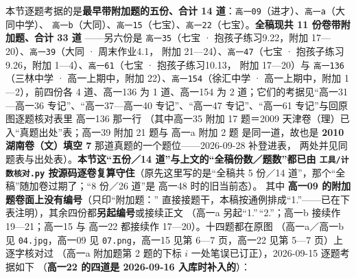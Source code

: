 \documentclass[a4paper,11pt]{article}
\begin{document}
本节逐题考据的是\textbf{最早带附加题的五份、合计 14 道}：\texttt{高一09}（进才）、\texttt{高一a}（大同中学）、
\texttt{高一b}（大同）、\texttt{高一15}（七宝）、\texttt{高一22}（七宝）。\textbf{全稿现共 11 份卷带附加题、合计 33 道}
------另六份是 \texttt{高一35}（七宝 · 抱孩子练习9.22，附加 17---20）、\texttt{高一39}（大同 · 周末作业4.1，
附加 21---24）、\texttt{高一47}（七宝 · 抱孩子练习9.26，附加 1---4）、\texttt{高一61}（七宝 · 抱孩子练习10.13，
附加 17---20）与 \texttt{高一136}（三林中学 · 高一上期中，附加 22）、\texttt{高一154}（徐汇中学 · 高一上期中，附加 1---2），前四份各 4 道、高一136 为 1 道、高一154 为 2 道；它们的考据见``高一31---高一36 专记''、``高一37---高一40 专记''、``高一47 专记''、``高一61 专记''与回原图逐题核对表里 高一136 那一行
（其中高一35 附加 17 题＝2009 天津卷（理）已入``真题出处''表；高一39 附加 21 题与 高一a 附加 2 题
是同一道，故也是 \textbf{2010 湖南卷（文）填空 7} 那道真题的一个题位------2026-09-28 补登进表，
两处并见同题表与出处表）。\textbf{本节这``五份／14 道''与上文的``全稿份数／题数''都已由 \texttt{工具/\allowbreak{}计数核对.py}
按源码逐卷复算守住}（原先这里写的是``全稿共 5 份／14 道''，那个``全稿''随加卷过期了；``8 份／26 道''是 高一48 时的旧当前态）。
其中 \textbf{高一09 的附加题卷面上没有编号}（只印``附加题：''
直接接题干，本稿按通例排成``1.''------已在下表注明），其余四份都\textbf{另起编号}或接续正文
（高一a 另起``1.''\,``2.''；高一b 接续作 19---21；高一15 与 高一22 都接续作 17---20）。十四题都在原图
（高一a／高一b 见 \texttt{04.jpg}，高一09 见 \texttt{07.png}，高一15 见第 6---7 页，高一22 见第 5---7 页）上逐字核对过
（高一a 附加题第 2 题的下标 \(i\) 一处笔误已订正），2026-09-15 逐题考据如下
（\textbf{高一22 的四道是 2026-09-16 入库时补入的}）：
\end{document}
